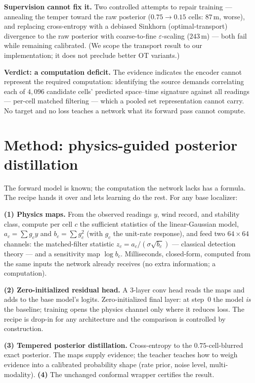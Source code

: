\documentclass{article}
\begin{document}
\textbf{Supervision cannot fix it.} Two controlled attempts to repair training
--- annealing the temper toward the raw posterior ($0.75\!\to\!0.15$ cells:
$87$\,m, worse), and replacing cross-entropy with a debiased Sinkhorn
(optimal-transport) divergence to the raw posterior with coarse-to-fine
$\varepsilon$-scaling ($243$\,m) --- both fail while remaining calibrated. (We
scope the transport result to our implementation; it does not preclude better
OT variants.)

\textbf{Verdict: a computation deficit.} The evidence indicates the encoder
cannot represent the required computation: identifying the source demands
correlating each of $4{,}096$ candidate cells' predicted space--time signature
against all readings --- per-cell matched filtering --- which a pooled set
representation cannot carry. No target and no loss teaches a network what its
forward pass cannot compute.

\section{Method: physics-guided posterior distillation}

The forward model is known; the computation the network lacks has a formula.
The recipe hands it over and lets learning do the rest. For any base
localizer:

\textbf{(1) Physics maps.} From the observed readings $y$, wind record, and
stability class, compute per cell $c$ the sufficient statistics of the
linear-Gaussian model, $a_c=\sum g_c y$ and $b_c=\sum g_c^2$ (with $g_c$ the
unit-rate response), and feed two $64\times64$ channels: the matched-filter
statistic $z_c=a_c/(\sigma\sqrt{b_c})$ --- classical detection theory --- and
a sensitivity map $\log b_c$. Milliseconds, closed-form, computed from the
same inputs the network already receives (no extra information; a
computation).

\textbf{(2) Zero-initialized residual head.} A 3-layer conv head reads the
maps and adds to the base model's logits. Zero-initialized final layer: at
step~0 the model \emph{is} the baseline; training opens the physics channel
only where it reduces loss. The recipe is drop-in for any architecture and
the comparison is controlled by construction.

\textbf{(3) Tempered posterior distillation.} Cross-entropy to the
$0.75$-cell-blurred exact posterior. The maps supply evidence; the teacher
teaches how to weigh evidence into a calibrated probability shape (rate
prior, noise level, multi-modality). \textbf{(4)} The unchanged conformal
wrapper certifies the result.
\end{document}
